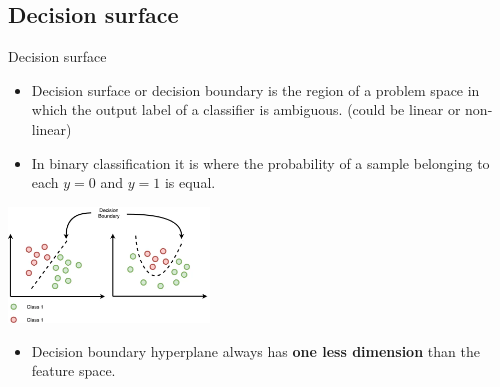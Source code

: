 \documentclass[serif, aspectratio=169]{beamer}
\begin{document}
    \subsection{Decision surface}
    \begin{frame}{Decision surface}
        \begin{itemize}
            \item Decision surface or decision boundary is the region of a problem space in which the output label of a classifier is ambiguous. (could be linear or non-linear)
            \item In binary classification it is where the probability of a sample belonging to each $y=0$ and $y=1$ is equal.
        \end{itemize}


        \begin{center}
            \includegraphics[width=0.4\textwidth]{pic/decision boundary.png}
        \end{center}

        \begin{itemize}

            \item Decision boundary hyperplane always has \textbf{one less dimension} than the feature space.




        \end{itemize}
    \end{frame}
\end{document}
